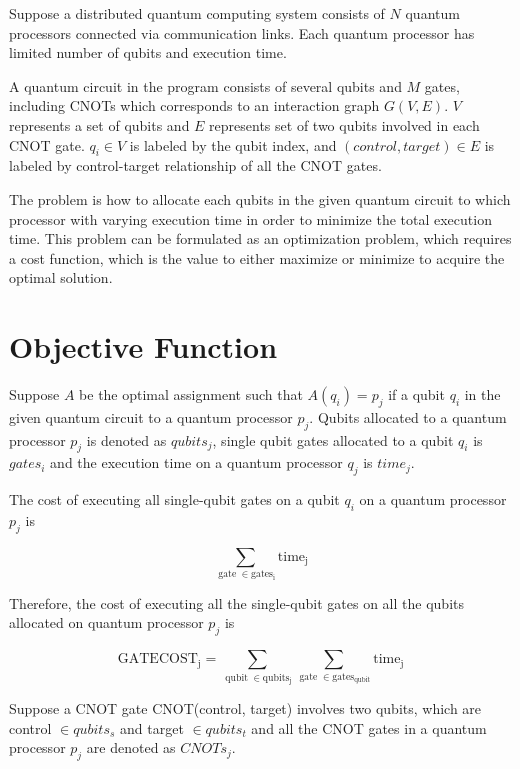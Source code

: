 Suppose a distributed quantum computing system consists of $N$ quantum processors connected via communication links. Each quantum processor has limited number of qubits and execution time.

A quantum circuit in the program consists of several qubits and $M$ gates, including CNOTs which corresponds to an interaction graph $G(V, E)$. $V$ represents a set of qubits and $E$ represents set of two qubits involved in each CNOT gate.  $q_i \in V$ is labeled by the qubit index, and $(control, target) \in E$ is labeled by control-target relationship of all the CNOT gates.

The problem is how to allocate each qubits in the given quantum circuit to which processor with varying execution time in order to minimize the total execution time. This problem can be formulated as an optimization problem, which requires a cost function, which is the value to either maximize or minimize to acquire the optimal solution.

\section{Objective Function}
Suppose $A$ be the optimal assignment such that $A(q_i) = p_j$ if a qubit $q_i$ in the given quantum circuit to a quantum processor $p_j$. Qubits allocated to a quantum processor $p_j$ is denoted as $qubits_j$, single qubit gates allocated to a qubit $q_i$ is $gates_i$ and the execution time on a quantum processor $q_j$ is $time_j$.

The cost of executing all single-qubit gates on a qubit $q_i$ on a quantum processor $p_j$ is 

 \begin{equation}
\sum_{ \operatorname{gate} \in  \operatorname{gates_i}}  \operatorname{time_j}
 \end{equation}
 
Therefore, the cost of executing all the single-qubit gates on all the qubits allocated on quantum processor $p_j$ is 

 \begin{equation}
\operatorname{GATECOST_j }= \sum_{ \operatorname{qubit} \in  \operatorname{qubits_j}} \sum_{ \operatorname{gate} \in  \operatorname{gates_{qubit}}}  \operatorname{time_j}
 \end{equation}

Suppose a CNOT gate CNOT(control, target) involves two qubits, which are control $\in qubits_s$ and target $\in qubits_t$ and all the CNOT gates in a quantum processor $p_j$ are denoted as $CNOTs_{j}$.

